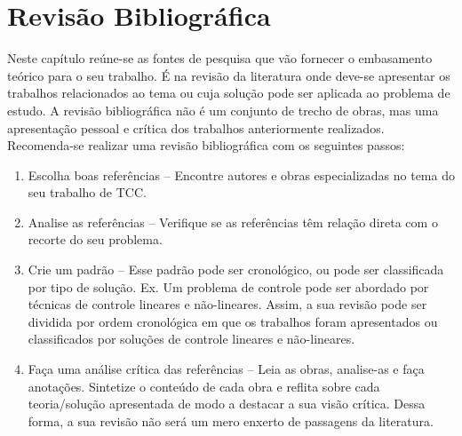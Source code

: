 \chapter{Revisão Bibliográfica}
Neste capítulo reúne-se as fontes de pesquisa que vão fornecer o embasamento teórico para o seu trabalho. É na revisão da literatura onde deve-se apresentar os trabalhos relacionados ao tema ou cuja solução pode ser aplicada ao problema de estudo. A revisão bibliográfica não é um conjunto de trecho de obras, mas uma apresentação pessoal e crítica dos trabalhos anteriormente realizados. Recomenda-se realizar uma revisão bibliográfica com os seguintes passos:
\begin{enumerate}
	\item Escolha boas referências – Encontre autores e obras especializadas no tema do seu trabalho de TCC.
	\item Analise as referências – Verifique se as referências têm relação direta com o recorte do seu problema.
	\item Crie um padrão – Esse padrão pode ser cronológico, ou pode ser classificada por tipo de solução. Ex. Um problema de controle pode ser abordado por técnicas de controle lineares e não-lineares. Assim, a sua revisão pode ser dividida por ordem cronológica em que os trabalhos foram apresentados ou classificados por soluções de controle lineares e não-lineares. 
	\item Faça uma análise crítica das referências – Leia as obras, analise-as e faça anotações. Sintetize o conteúdo de cada obra e reflita sobre cada teoria/solução apresentada de modo a destacar a sua visão crítica. Dessa forma, a sua revisão não será um mero enxerto de passagens da literatura.
\end{enumerate}
